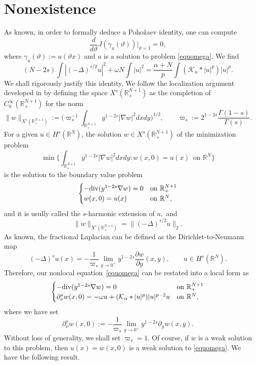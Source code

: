 \documentclass[10pt]{amsart}
\numberwithin{equation}{section}
\begin{document}
\section{Nonexistence}
\label{nonex}
\noindent
As known, in order to formally deduce a Poho\v zaev identity, one can compute
$$
\frac{d}{d\vartheta}J(\gamma_{u}(\vartheta)){\Big|_{\vartheta=1}}=0,
$$
where $\gamma_{u}(\vartheta):=u(\vartheta x)$ and $u$ is a solution to problem \eqref{equomega}.
 We find
\begin{equation}\label{Pohozaev}
  (N-2s)\int |(-\Delta)^{s/2}u|^2+\omega N\int |u|^{2}=\frac{\alpha+N}{p}\int {{(\mathcal K_{\alpha}*|u|^{p})}} |u|^{p}.
\end{equation}
We shall rigorously justify this identity. 
We follow the localization argument developed in \cite{ChangWang} by defining
the space $X^s({{\mathbb R}}_+^{N+1})$ as the completion of $C^\infty_0({{\mathbb R}}^{N+1}_+)$ for the norm
$$
\|w\|_{X^s({{\mathbb R}}_+^{N+1})}:=\Big(\varpi_s^{-1}\int_{{{\mathbb R}}^{N+1}_+} y^{1-2s}|\nabla w|^2 dxdy\Big)^{1/2},\qquad
\varpi_s:=2^{1-2s}\frac{\Gamma(1-s)}{\Gamma(s)}.
$$
For a given $u\in H^s({{\mathbb R}}^N)$, the solution $w\in X^s({{\mathbb R}}_+^{N+1})$
of the minimization problem
$$
\min\Big\{\int_{{{\mathbb R}}^{N+1}_+}y^{1-2s}|\nabla w|^2 dxdy: w(x,0)=u(x)\,\,\,\text{on ${{\mathbb R}}^N$}\Big\}
$$
is the solution to the boundary value problem
$$
\begin{cases}
-{\rm div}(y^{1-2s}\nabla w)=0 & \text{on ${{\mathbb R}}^{N+1}_+$}  \\
w(x,0)=u(x)  & \text{on ${{\mathbb R}}^{N}$} ,
\end{cases}
$$
and it is usully called the $s$-harmonic extension of $u,$ and
$$
\|w\|_{X^s({{\mathbb R}}_+^{N+1})}=\|(-\Delta)^{s/2}u\|_{2}.
$$ 
As known, the fractional Laplacian can be defined as the Dirichlet-to-Neumann map
$$
(-\Delta)^s u(x)=-\frac{1}{\varpi_s}\lim_{y\to 0^+} y^{1-2s}\frac{\partial w}{\partial y}(x,y),
\qquad u\in H^s({{\mathbb R}}^N).
$$
Therefore, our nonlocal equation~\eqref{equomega} can be restated into a local form as
\begin{equation*} 
\begin{cases}
-{\rm div}(y^{1-2s}\nabla w)=0 & \text{on ${{\mathbb R}}^{N+1}_+$}  \\
\partial^s_\nu w(x,0)=-\omega u+ {{(\mathcal K_{\alpha}*|u|^{p})}} |u|^{p-2}u  & \text{on ${{\mathbb R}}^{N}$} ,
\end{cases}
\end{equation*}
where we have set
$$
\partial^s_\nu w(x,0):=-\frac{1}{\varpi_s}\lim_{y\to 0^+} y^{1-2s}\partial_y w(x,y).
$$
Without loss of generality, we shall set $\varpi_s=1$.
Of course, if $w$ is a weak solution to this problem, then $u(x)=w(x,0)$ is a weak solution to \eqref{equomega}.
\vskip4pt
\noindent
We have the following result.
\end{document}
